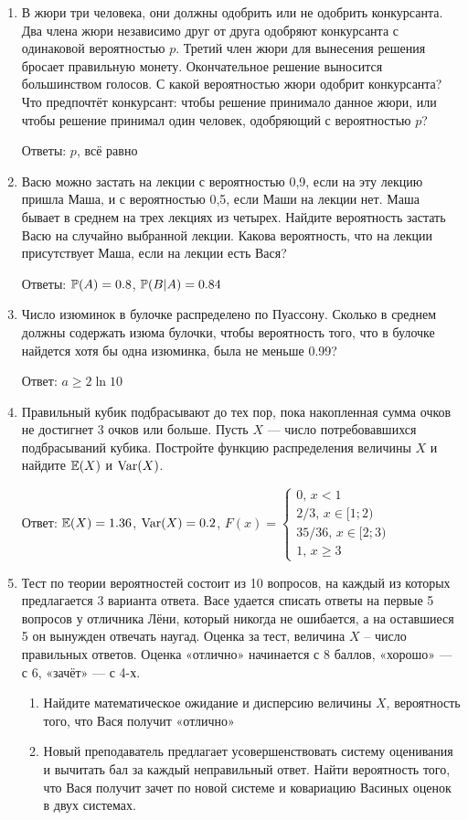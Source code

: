 \documentclass[12pt, a4paper]{article}\usepackage[]{graphicx}\usepackage[]{color}
\begin{document}
	\begin{enumerate}
		\item В жюри три человека, они должны одобрить или не одобрить конкурсанта. Два члена жюри независимо друг от друга одобряют конкурсанта с  одинаковой вероятностью $p$. Третий член жюри для вынесения решения бросает правильную монету. Окончательное решение выносится большинством голосов. С какой вероятностью жюри одобрит конкурсанта? Что предпочтёт конкурсант: чтобы решение принимало данное жюри, или чтобы решение принимал один человек, одобряющий с вероятностью $p$?

		Ответы: $p$, всё равно

		\item Васю можно застать на лекции с вероятностью 0,9, если на эту лекцию пришла Маша, и с вероятностью 0,5, если Маши на лекции нет. Маша бывает в среднем на трех лекциях из четырех. Найдите вероятность застать Васю на случайно выбранной лекции. Какова вероятность, что на лекции присутствует Маша, если на лекции есть Вася?

		Ответы: $\P(A)=0.8$, $\P(B|A)=0.84$

		\item Число изюминок в булочке распределено по Пуассону. Сколько в среднем должны содержать изюма булочки, чтобы вероятность того, что в булочке найдется хотя бы одна изюминка, была не меньше 0.99?

		Ответ: $a\geq 2\ln 10$

		\item Правильный кубик подбрасывают до тех пор, пока накопленная сумма очков не достигнет 3 очков или больше. Пусть $X$ — число потребовавшихся подбрасываний кубика. Постройте функцию распределения величины $X$ и найдите $\E(X)$ и $\Var(X)$.

		Ответ: $\E(X)=1.36$, $\Var(X)=0.2$, $F(x)=\begin{cases}
		0, \, x<1 \\
		2/3, \, x\in [1;2) \\
		35/36, \, x\in[2;3) \\
		1, \, x\geq 3
		\end{cases}$

		\item Тест по теории вероятностей состоит из 10 вопросов, на каждый из которых предлагается 3 варианта ответа. Васе удается списать ответы на первые 5 вопросов у отличника Лёни, который никогда не ошибается, а на оставшиеся 5 он вынужден отвечать наугад. Оценка за тест, величина $X$ – число правильных ответов. Оценка «отлично» начинается с 8 баллов, «хорошо» — с 6, «зачёт» — с 4-х.
		\begin{enumerate}
			\item Найдите математическое ожидание и дисперсию величины $X$, вероятность того, что Вася получит «отлично»
			\item Новый преподаватель предлагает усовершенствовать систему оценивания и вычитать бал за каждый неправильный ответ. Найти вероятность того, что Вася получит зачет по новой системе и ковариацию Васиных оценок в двух системах.
		\end{enumerate}


\end{enumerate}
\end{document}
